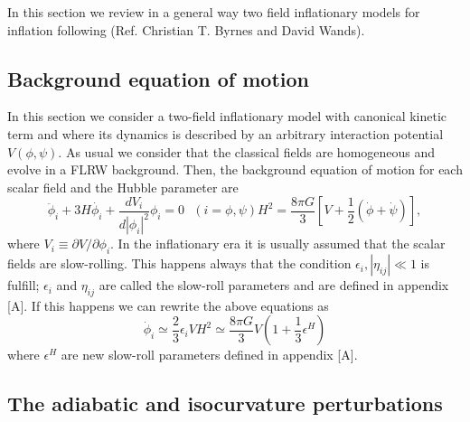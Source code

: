 \documentclass[twocolumn,           %
               showpacs,            %
               preprintnumbers,     %
               aps,                 %
               prl,          	    %
               letterpaper,             %
               superscriptaddress,      %
               nofootinbib,         %
               tightenlines,        %
               floats,floatfix      %
               ,usenatbib,
               ]{revtex4-1}
\begin{document}
In this section we review in a general way two field inflationary models for inflation following (Ref. Christian T. Byrnes and David Wands). 

\subsection{Background equation of motion}

In this section we consider a two-field inflationary model with canonical kinetic term and where its dynamics is described by an arbitrary interaction potential $V(\phi,\psi)$. As usual we consider that the classical fields are homogeneous and evolve in a FLRW background. Then, the background equation of motion for each scalar field and the Hubble parameter are
\begin{subequations}
\begin{equation}\label{KGEq}
\ddot{\phi}_i+3H\dot{\phi_i}+\frac{dV_i}{d|\phi_i|^2}\phi_i=0 \ \ \ (i=\phi,\psi)
\end{equation}
\begin{equation}
H^2=\frac{8\pi G}{3}\left[V+\frac{1}{2}\left(\dot{\phi}+\dot\psi\right)\right],
\end{equation}
\end{subequations}
where $V_i\equiv\partial V/\partial \phi_i$. In the inflationary era it is usually assumed that the scalar fields are slow-rolling. This happens always that the condition $\epsilon_i,|\eta_{ij}|\ll 1$ is fulfill; $\epsilon_i$ and $\eta_{ij}$ are called the slow-roll parameters and are defined in appendix [A]. If this happens we can rewrite the above equations as
\begin{subequations}
\begin{equation}
\dot{\phi}_i\simeq \frac{2}{3}\epsilon_i V
\end{equation}
\begin{equation}
H^2\simeq \frac{8\pi G}{3}V\left(1+\frac{1}{3}\epsilon^H\right)
\end{equation}
\end{subequations}
where $\epsilon^H$ are new slow-roll parameters defined in appendix [A]. 
\subsection{The adiabatic and isocurvature perturbations}
\end{document}
